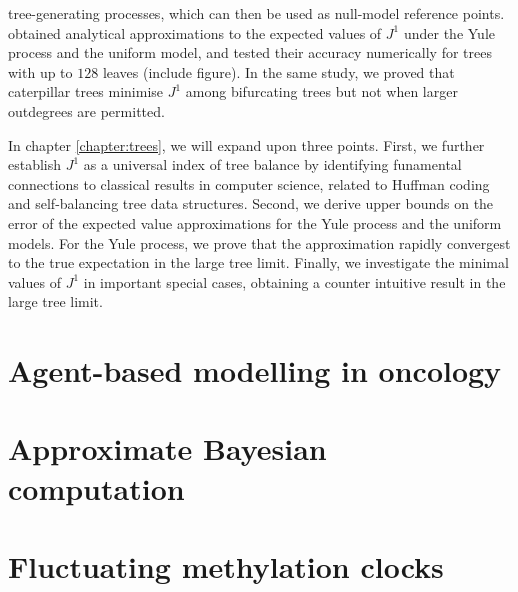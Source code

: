 tree-generating processes, which can then be used as null-model reference points. \cite{lemant_robust_2022}
obtained analytical approximations to the expected values of $J^1$ under the Yule process and the uniform
model, and tested their accuracy numerically for trees with up to $128$ leaves (include figure). In the
same study, we proved that caterpillar trees minimise $J^1$ among bifurcating trees but not when larger
outdegrees are permitted.\par
In chapter \ref{chapter:trees}, we will expand upon three points. First, we further establish $J^1$ as a
universal index of tree balance by identifying funamental connections to classical results in
computer science, related to Huffman coding and self-balancing tree data structures. Second, we derive
upper bounds on the error of the expected value approximations for the Yule process and the uniform models.
For the Yule process, we prove that the approximation rapidly convergest to the true expectation in the
large tree limit. Finally, we investigate the minimal values of $J^1$ in important special cases,
obtaining a counter intuitive result in the large tree limit.

\section{Agent-based modelling in oncology}

\section{Approximate Bayesian computation}

\section{Fluctuating methylation clocks}
